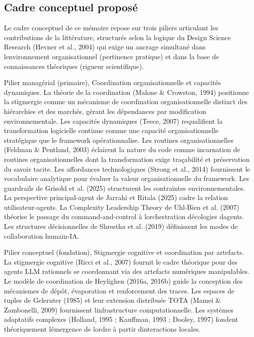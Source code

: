 \documentclass[12pt,a4paper]{article}
\begin{document}
\subsection{Cadre conceptuel proposé}\label{cadre-conceptuel-proposuxe9}

Le cadre conceptuel de ce mémoire repose sur trois piliers articulant
les contributions de la littérature, structurés selon la logique du
Design Science Research (Hevner et al., 2004) qui exige un ancrage
simultané dans l\textquotesingle environnement organisationnel
(pertinence pratique) et dans la base de connaissances théoriques
(rigueur scientifique).

Pilier managérial (primaire), Coordination organisationnelle et
capacités dynamiques. La théorie de la coordination (Malone \& Crowston,
1994) positionne la stigmergie comme un mécanisme de coordination
organisationnelle distinct des hiérarchies et des marchés, gérant les
dépendances par modification environnementale. Les capacités dynamiques
(Teece, 2007) requalifient la transformation logicielle continue comme
une capacité organisationnelle stratégique que le framework
opérationnalise. Les routines organisationnelles (Feldman \& Pentland,
2003) éclairent la nature du code comme incarnation de routines
organisationnelles dont la transformation exige traçabilité et
préservation du savoir tacite. Les affordances technologiques (Strong
et al., 2014) fournissent le vocabulaire analytique pour évaluer la
valeur organisationnelle du framework. Les guardrails de Grisold et al.
(2025) structurent les contraintes environnementales. La perspective
principal-agent de Jarrahi et Ritala (2025) cadre la relation
utilisateur-agents. La Complexity Leadership Theory de Uhl-Bien et al.
(2007) théorise le passage du command-and-control à
l\textquotesingle orchestration d\textquotesingle écologies
d\textquotesingle agents. Les structures décisionnelles de Shrestha et
al. (2019) définissent les modes de collaboration humain-IA.

Pilier conceptuel (fondation), Stigmergie cognitive et coordination
par artefacts. La stigmergie cognitive (Ricci et al., 2007) fournit le
cadre théorique pour des agents LLM rationnels se coordonnant via des
artefacts numériques manipulables. Le modèle de coordination de
Heylighen (2016a, 2016b) guide la conception des mécanismes de dépôt,
évaporation et renforcement des traces. Les espaces de tuples de
Gelernter (1985) et leur extension distribuée TOTA (Mamei \& Zambonelli,
2009) fournissent l\textquotesingle infrastructure computationnelle. Les
systèmes adaptatifs complexes (Holland, 1995 ; Kauffman, 1993 ; Dooley,
1997) fondent théoriquement l\textquotesingle émergence de
l\textquotesingle ordre à partir d\textquotesingle interactions locales.
\end{document}
